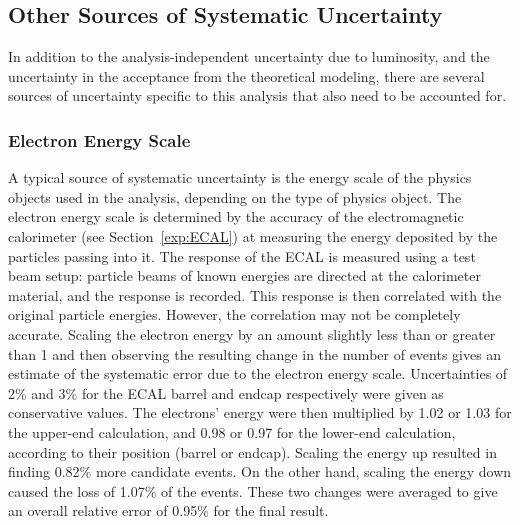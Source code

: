\subsection{Other Sources of Systematic Uncertainty}
\label{anMeth:SystsOther}


In addition to the analysis-independent 
uncertainty due to luminosity, 
and the uncertainty in the acceptance 
from the theoretical modeling, 
there are several sources of 
uncertainty specific to this analysis 
that also need to be accounted for.  

\subsubsection{Electron Energy Scale}
\label{anMeth:SystsOtherEleEScale}


A typical source of systematic uncertainty 
is the energy scale of the physics objects 
used in the analysis, 
depending on the type of physics object.  
The electron energy scale is determined 
by the accuracy of the electromagnetic 
calorimeter (see Section~\ref{exp:ECAL})
at measuring the energy 
deposited by the particles passing into it.  
The response of the ECAL is measured 
using a test beam setup: 
particle beams of known energies are 
directed at the calorimeter material, 
and the response is recorded.  
This response is then correlated with the 
original particle energies.  
However, the correlation may not be completely 
accurate.  
Scaling the electron energy by an amount 
slightly less than or greater than 1 
and then observing the resulting change 
in the number of \Zee events 
gives an estimate of the systematic error 
due to the electron energy scale.  
Uncertainties of 2\% and 3\% %
for the ECAL barrel and endcap respectively 
were given as conservative values.  
The electrons' energy were then multiplied 
by 1.02 or 1.03 for the upper-end calculation, 
and 0.98 or 0.97 for the lower-end calculation, 
according to their position (barrel or endcap).  
Scaling the energy up resulted in finding 
0.82\% more \Zee candidate events.  
On the other hand, scaling the energy down 
caused the loss of 1.07\% of the events.  
These two changes were averaged 
to give an overall relative error 
of 0.95\% for the final result.  

